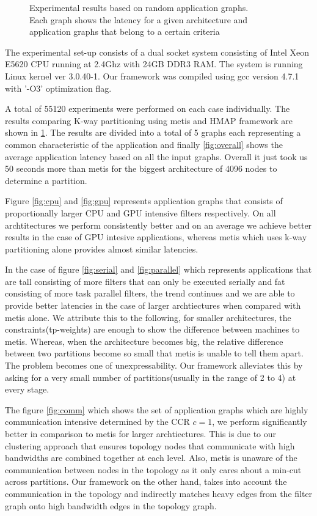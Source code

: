 \begin{figure}[ht!]
{    \label{fig:overall}
  }
  \caption{Experimental results based on random application
  graphs.\\ Each graph shows the latency for a given architecture and
  application graphs that belong to a certain criteria}
  \label{fig:exp-res}
\end{figure}

The experimental set-up consists of a dual socket system consisting of
Intel Xeon E5620 CPU running at 2.4Ghz with 24GB DDR3 RAM. The system
is running Linux kernel ver 3.0.40-1. Our framework was compiled
using gcc version 4.7.1 with '-O3' optimization flag.

A total of 55120 experiments were performed on each case individually.
The results comparing K-way partitioning using metis and HMAP framework
are shown in \ref{fig:exp-res}. The results are divided into a total of 5
graphs each representing a common characteristic of the application and
finally \ref{fig:overall} shows the average application latency based on all
the input graphs. Overall it just took us 50 seconds more than metis for the
biggest architecture of 4096 nodes to determine a partition.

Figure \ref{fig:cpu} and \ref{fig:gpu} represents application graphs that
consists of proportionally larger CPU and GPU intensive filters respectively.
On all archtitectures we perform consistently better and on an average we
achieve better results in the case of GPU intesive applications, whereas metis
which uses k-way partitioning alone provides almost similar latencies.

In the case of figure \ref{fig:serial} and \ref{fig:parallel} which represents
applications that are tall consisting of more filters that can only be
executed serially and fat consisting of more task parallel filters, the trend
continues and we are able to provide better latencies in the case of larger
archtiectures when compared with metis alone. We attribute this to the
following, for smaller architectures, the constraints(tp-weights) are enough to
show the difference between machines to metis. Whereas, when the architecture
becomes big, the relative difference between two partitions become so small that
metis is unable to tell them apart. The problem becomes one of unexpressability.
Our framework alleviates this by asking for a very small number of
partitions(usually in the range of 2 to 4) at every stage.

The figure \ref{fig:comm} which shows the set of application graphs which are
highly communication intensive determined by the CCR $c=1$, we perform
significantly better in comparison to metis for larger archtiectures. This is
due to our clustering approach that ensures topology nodes that communicate
with high bandwidths are combined together at each level. Also, metis is unaware
of the communication between nodes in the topology as it only cares about a
min-cut across partitions. Our framework on the other hand, takes into account
the communication in the topology and indirectly matches heavy edges from the
filter graph onto high bandwidth edges in the topology graph.

